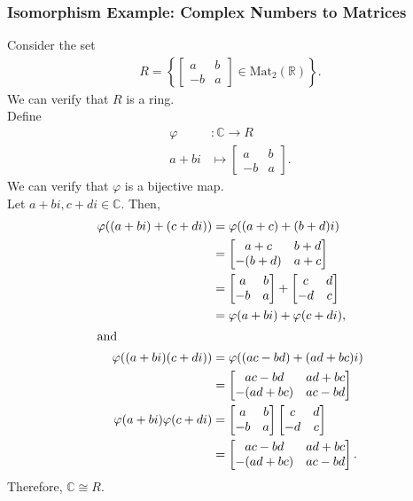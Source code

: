 \documentclass[10pt]{extarticle}
\newcommand{\R}{\mathbb{R}}
\newcommand{\C}{\mathbb{C}}
\begin{document}
  \subsubsection{Isomorphism Example: Complex Numbers to Matrices}%
  Consider the set
  \begin{align*}
    R = \left\{ \begin{bmatrix}a&b\\-b & a\end{bmatrix}\in \text{Mat}_{2}(\R)\right\}.
  \end{align*}
  We can verify that $R$ is a ring.\\

  Define
  \begin{align*}
    \varphi&: \C\rightarrow R\\
    a + bi &\mapsto \begin{bmatrix}a&b\\-b&a\end{bmatrix}.
  \end{align*}
  We can verify that $\varphi$ is a bijective map.\\

  Let $a+bi,c+di\in \C$. Then,
  \begin{align*}
    \varphi((a+bi) + (c+di)) &= \varphi((a+c) + (b+d)i)\\
                             &= \begin{bmatrix}a+c & b+ d\\-(b+d) & a+c\end{bmatrix}\\
                             &= \begin{bmatrix}a&b\\-b&a\end{bmatrix} + \begin{bmatrix}c & d\\-d&c\end{bmatrix}\\
                             &= \varphi(a+bi) + \varphi(c+di),\\
                             \shortintertext{and}
    \varphi((a+bi)(c+di)) &= \varphi((ac-bd) + (ad + bc)i)\\
                          &= \begin{bmatrix}ac-bd & ad + bc\\ -(ad + bc) & ac - bd\end{bmatrix}\\
    \varphi(a+bi)\varphi(c+di) &= \begin{bmatrix}a&b\\-b&a\end{bmatrix} \begin{bmatrix}c&d\\-d&c\end{bmatrix}\\
                               &= \begin{bmatrix}ac-bd & ad + bc\\-(ad+bc) & ac-bd\end{bmatrix}.
  \end{align*}
  Therefore, $\C\cong R$.
\end{document}
